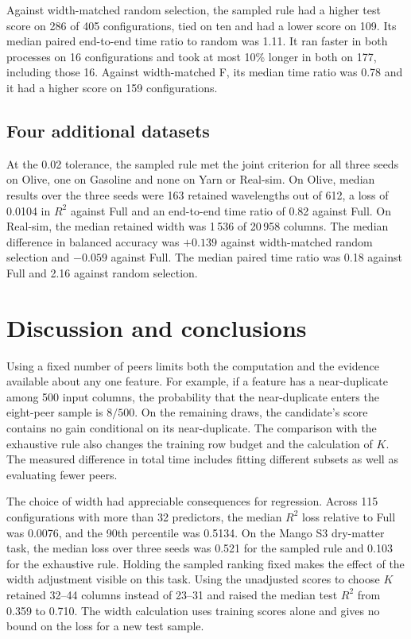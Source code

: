 \documentclass[11pt,a4paper]{article}
\begin{document}
Against width-matched random selection, the sampled rule had a higher test score on 286 of 405 configurations, tied on ten and had a lower score on 109. Its median paired end-to-end time ratio to random was 1.11. It ran faster in both processes on 16 configurations and took at most 10\% longer in both on 177, including those 16. Against width-matched F, its median time ratio was 0.78 and it had a higher score on 159 configurations.

\subsection{Four additional datasets}
At the 0.02 tolerance, the sampled rule met the joint criterion for all three seeds on Olive, one on Gasoline and none on Yarn or Real-sim. On Olive, median results over the three seeds were 163 retained wavelengths out of 612, a loss of 0.0104 in $R^2$ against Full and an end-to-end time ratio of 0.82 against Full. On Real-sim, the median retained width was 1\,536 of 20\,958 columns. The median difference in balanced accuracy was $+0.139$ against width-matched random selection and $-0.059$ against Full. The median paired time ratio was 0.18 against Full and 2.16 against random selection.

\FloatBarrier
\section{Discussion and conclusions}
Using a fixed number of peers limits both the computation and the evidence available about any one feature. For example, if a feature has a near-duplicate among 500 input columns, the probability that the near-duplicate enters the eight-peer sample is $8/500$. On the remaining draws, the candidate's score contains no gain conditional on its near-duplicate. The comparison with the exhaustive rule also changes the training row budget and the calculation of $K$. The measured difference in total time includes fitting different subsets as well as evaluating fewer peers.

The choice of width had appreciable consequences for regression. Across 115 configurations with more than 32 predictors, the median $R^2$ loss relative to Full was 0.0076, and the 90th percentile was 0.5134. On the Mango S3 dry-matter task, the median loss over three seeds was 0.521 for the sampled rule and 0.103 for the exhaustive rule. Holding the sampled ranking fixed makes the effect of the width adjustment visible on this task. Using the unadjusted scores to choose $K$ retained 32--44 columns instead of 23--31 and raised the median test $R^2$ from 0.359 to 0.710. The width calculation uses training scores alone and gives no bound on the loss for a new test sample.
\end{document}
